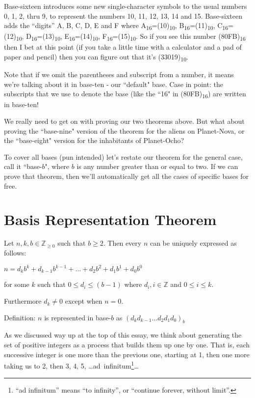 \documentclass{article}
\newenvironment{jprIn}{\begin{adjustwidth}{2em}{}}{\end{adjustwidth}}
\begin{document}
Base-sixteen introduces some new single-character symbols to the usual numbers 0, 1,
2, thru 9,
to represent the numbers 10, 11, 12, 13, 14 and 15.
Base-sixteen adds the ``digits'' A, B, C, D, E and F where
A\textsubscript{16}=(10)\textsubscript{10},
B\textsubscript{16}=(11)\textsubscript{10},
C\textsubscript{16}=(12)\textsubscript{10},
D\textsubscript{16}=(13)\textsubscript{10},
E\textsubscript{16}=(14)\textsubscript{10},
F\textsubscript{16}=(15)\textsubscript{10}.
So if you see this number (80FB)\textsubscript{16} then
I bet at this point (if you take a little time with a
calculator and a pad of paper and pencil) then you can
figure out that it's (33019)\textsubscript{10}.

Note that if we omit the parentheses and subscript from a number,
it means we're talking about it in base-ten - our ``default" base.
Case in point: the subscripts that we use to denote the base
(like the ``16" in (80FB)\textsubscript{16}) are written in base-ten!

We really need to get on with proving our two theorems above.
But what about proving the ``base-nine" version of the theorem for the aliens on Planet-Nova,
or the ``base-eight" version for the inhabitants of Planet-Ocho?

To cover all bases (pun intended) let's restate our theorem for the general case,
call it ``base-$b$",
where $b$ is any number greater than or equal to two.
If we can prove that theorem,
then we'll automatically get all the cases of specific bases for free.

\section*{Basis Representation Theorem}

\begin{jprIn}
Let $n,k,b\in \mathbb{Z}_{\ge 0}$ such that $b\ge2$.
Then every $n$ can be uniquely expressed as follows:

\hspace{3em}$n=d_kb^k+d_{k-1}b^{k-1}+\dots+d_2b^2+d_1b^1+d_0b^0$

for some $k$ such that $0 \le d_i \le (b-1)$ where $d_i,i\in\mathbb{Z}$ and $0 \le i \le k$.

Furthermore $d_k\ne0$ except when $n=0$.

Definition: $n$ is represented in base-$b$ as $(d_kd_{k-1}\dots{}d_2d_1d_0)_b$
\end{jprIn}
\bigskip

As we discussed way up at the top of this essay,
we think about generating the set of positive integers as a process that builds them up one by one.
That is, each successive integer is one more than the previous one,
starting at 1, then one more
taking us to 2,
then 3, 4, 5, \dots{}ad~infinitum\footnote{``ad infinitum'' means ``to infinity'', or ``continue forever, without limit''.}\dots
\end{document}
